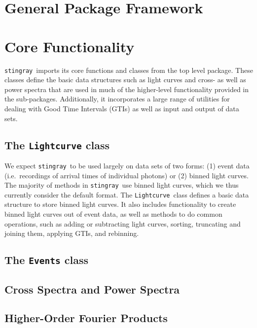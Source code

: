 \documentclass[12pt]{emulateapj}
\newcommand{\stingray}{\texttt{stingray}}
\newcommand{\lightcurve}{\texttt{Lightcurve}}
\begin{document}
\section{General Package Framework}
\label{sec:general_package}




\section{Core Functionality}
\label{sec:core}

\stingray\ imports its core functions and classes from the top level package. These classes define the basic data structures such as light curves and cross- as well as power spectra that are used in much of the higher-level functionality provided in the sub-packages. Additionally, it incorporates a large range of utilities for dealing with Good Time Intervals (GTIs) as well as input and output of data sets.


\subsection{The \texttt{Lightcurve} class}
\label{sec:lightcurve}

We expect \stingray\ to be used largely on data sets of two forms: (1) event data (i.e.\ recordings of arrival times of individual photons) or (2) binned light curves. The majority of methods in \stingray\ use binned light curves, which we thus currently consider the default format. The \lightcurve\ class defines a basic data structure to store binned light curves. It also includes functionality to create binned light curves out of event data, as well as methods to do common operations, such as adding or subtracting light curves, sorting, truncating and joining them, applying GTIs, and rebinning. 

\subsection{The \texttt{Events} class}

\subsection{Cross Spectra and Power Spectra}
\label{sec:csps}

\subsection{Higher-Order Fourier Products}
\label{sec:fourier_others}
\end{document}
